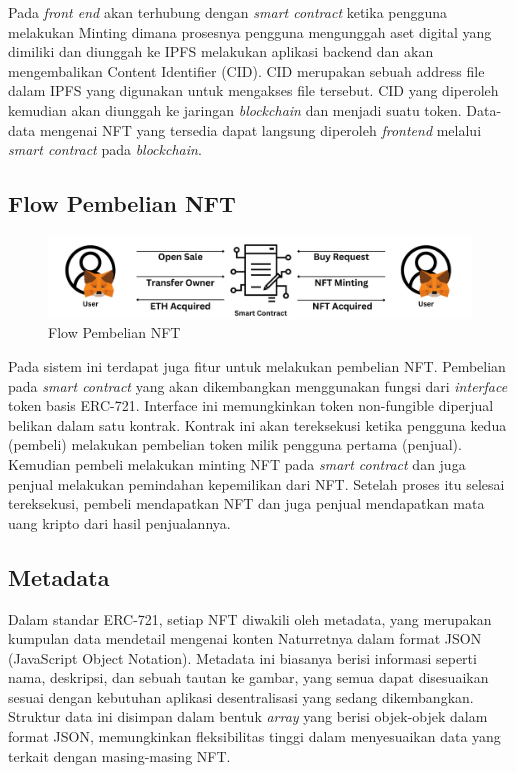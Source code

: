 Pada \emph{front end} akan terhubung dengan \emph{smart contract} ketika pengguna melakukan Minting dimana prosesnya pengguna mengunggah aset digital yang dimiliki dan diunggah ke IPFS melakukan aplikasi backend dan akan mengembalikan Content Identifier (CID). CID merupakan sebuah address file dalam IPFS yang digunakan untuk mengakses file tersebut. CID yang diperoleh kemudian akan diunggah ke jaringan \emph{blockchain} dan menjadi suatu token. Data-data mengenai NFT yang tersedia dapat langsung diperoleh \emph{frontend} melalui \emph{smart contract} pada \emph{blockchain}. 


\subsection{Flow Pembelian NFT}
\begin{figure} [H] \centering
  \includegraphics[scale=0.22]{gambar/flow_transaksi.png}
  \caption{Flow Pembelian NFT}
  \label{fig:flowtransaksi}
\end{figure}

Pada sistem ini terdapat juga fitur untuk melakukan pembelian NFT. Pembelian pada \emph{smart contract} yang akan dikembangkan menggunakan fungsi dari \emph{interface} token basis ERC-721. Interface ini memungkinkan token non-fungible diperjual belikan dalam satu kontrak. Kontrak ini akan tereksekusi ketika pengguna kedua (pembeli) melakukan pembelian token milik pengguna pertama (penjual). Kemudian pembeli melakukan minting NFT pada \emph{smart contract} dan juga penjual melakukan pemindahan kepemilikan dari NFT. Setelah proses itu selesai tereksekusi, pembeli mendapatkan NFT dan juga penjual mendapatkan mata uang kripto dari hasil penjualannya.

\subsection{Metadata}



Dalam standar ERC-721, setiap NFT diwakili oleh metadata, yang merupakan kumpulan data mendetail mengenai konten Naturretnya dalam format JSON (JavaScript Object Notation). Metadata ini biasanya berisi informasi seperti nama, deskripsi, dan sebuah tautan ke gambar, yang semua dapat disesuaikan sesuai dengan kebutuhan aplikasi desentralisasi yang sedang dikembangkan. Struktur data ini disimpan dalam bentuk \emph{array} yang berisi objek-objek dalam format JSON, memungkinkan fleksibilitas tinggi dalam menyesuaikan data yang terkait dengan masing-masing NFT.

